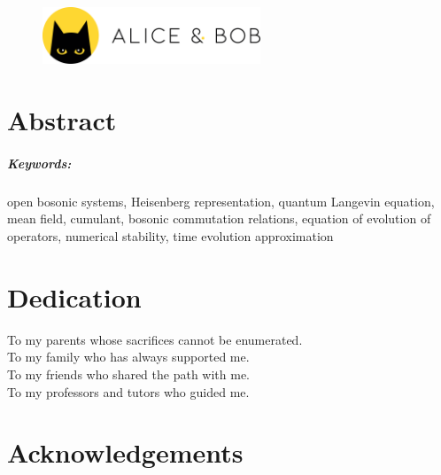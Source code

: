 \documentclass[a4paper,11pt,english]{report}
\newenvironment{dedication}
  {
   \thispagestyle{empty}%
   \vspace*{\stretch{1}}%
   \itshape             %
   \raggedleft          %
  }
  {\par %
   \vspace{\stretch{3}} %
   \clearpage           %
  }
\begin{document}
\begin{center}
    \begin{figure}[h!]
    \centering
    \includegraphics[width=6.5cm]{Pics/logo_ab.pdf}
\end{figure}
\end{center}


\newpage
\clearpage
{}
\chapter*{Abstract}

\paragraph{Keywords:} open bosonic systems, Heisenberg representation, quantum Langevin equation, mean field, cumulant, bosonic commutation relations, equation of evolution of operators, numerical stability, time evolution approximation


\newpage
\clearpage
{}
\chapter*{Dedication}

\begin{dedication}
    To my parents whose sacrifices cannot be enumerated.\\
    To my family who has always supported me.\\
    To my friends who shared the path with me.\\
    To my professors and tutors who guided me.\\
\end{dedication}

\newpage
\clearpage
{}
\chapter*{Acknowledgements}


\tableofcontents
\listoftables
\listoffigures
\end{document}
